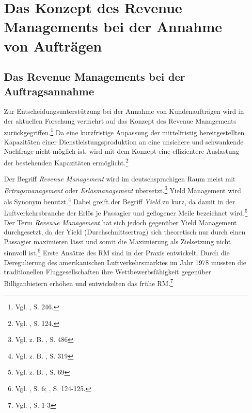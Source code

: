 \chapter{Das Konzept des Revenue Managements bei der Annahme von Aufträgen}\label{KapitelDP}
\setcounter{footnote}{4}  %


\section{Das Revenue Managements bei der Auftragsannahme}
Zur Entscheidungsunterstützung bei der Annahme von Kundenaufträgen wird in der aktuellen Forschung vermehrt auf das Konzept des Revenue Managements zurückgegriffen.\footnote{Vgl. \cite{klein2001revenue}, S. 246.} Da eine kurzfristige Anpassung der mittelfristig bereitgestellten Kapazitäten einer Dienstleistungsproduktion an eine unsichere und schwankende Nachfrage nicht möglich ist, wird mit dem Konzept eine effizientere Auslastung der bestehenden Kapazitäten ermöglicht.\footnote{Vgl. \cite{ing2005revenue}, S. 124.}

Der Begriff \textit{Revenue Management} wird im deutschsprachigen Raum meist mit \textit{Ertrags}\-\textit{management} oder \textit{Erlösmanagement} übersetzt.\footnote{Vgl. z. B. \cite{zehle1991yield}, S. 486} Yield Management wird als Synonym benutzt.\footnote{Vgl. z. B. \cite{kolisch2006revenue}, S. 319} Dabei greift der Begriff \textit{Yield} zu kurz, da damit in der Luftverkehrsbranche der Erlös je Passagier und geflogener Meile bezeichnet wird.\footnote{Vgl. z. B. \cite{weatherford1998tutorial}, S. 69} Der Term \textit{Revenue Management} hat sich jedoch gegenüber Yield Management durchgesetzt, da der Yield (Durchschnittsertrag) sich theoretisch nur durch einen Passagier maximieren lässt und somit die Maximierung als Zielsetzung nicht sinnvoll ist.\footnote{Vgl. \cite{Klein:2008aa}, S. 6; \cite{ing2005revenue}, S. 124-125.} Erste Ansätze des RM sind in der Praxis entwickelt. Durch die Deregulierung des amerikanischen Luftverkehrsmarktes im Jahr 1978 mussten die traditionellen Fluggesellschaften ihre Wettbewerbsfähigkeit gegenüber Billiganbietern erhöhen und entwickelten das frühe RM.\footnote{Vgl. \cite{Petrick:2009aa}, S. 1-3}


